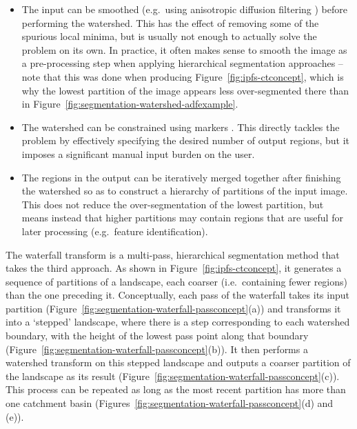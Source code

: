 \documentclass[preprint,a4paper]{elsarticle}
\begin{document}
\begin{itemize}

\item The input can be smoothed (e.g.~using anisotropic diffusion filtering \cite{perona90}) before performing the watershed. This has the effect of removing some of the spurious local minima, but is usually not enough to actually solve the problem on its own. In practice, it often makes sense to smooth the image as a pre-processing step when applying hierarchical segmentation approaches -- note that this was done when producing Figure~\ref{fig:ipfs-ctconcept}, which is why the lowest partition of the image appears less over-segmented there than in Figure~\ref{fig:segmentation-watershed-adfexample}.

\item The watershed can be constrained using markers \cite{meyer90}. This directly tackles the problem by effectively specifying the desired number of output regions, but it imposes a significant manual input burden on the user.

\item The regions in the output can be iteratively merged together after finishing the watershed so as to construct a hierarchy of partitions of the input image. This does not reduce the over-segmentation of the lowest partition, but means instead that higher partitions may contain regions that are useful for later processing (e.g.~feature identification).

\end{itemize}
%
The waterfall transform is a multi-pass, hierarchical segmentation method that takes the third approach. As shown in Figure~\ref{fig:ipfs-ctconcept}, it generates a sequence of partitions of a landscape, each coarser (i.e.~containing fewer regions) than the one preceding it. Conceptually, each pass of the waterfall takes its input partition (Figure~\ref{fig:segmentation-waterfall-passconcept}(a)) and transforms it into a `stepped' landscape, where there is a step corresponding to each watershed boundary, with the height of the lowest pass point along that boundary (Figure~\ref{fig:segmentation-waterfall-passconcept}(b)). It then performs a watershed transform on this stepped landscape and outputs a coarser partition of the landscape as its result (Figure~\ref{fig:segmentation-waterfall-passconcept}(c)). This process can be repeated as long as the most recent partition has more than one catchment basin (Figures~\ref{fig:segmentation-waterfall-passconcept}(d) and (e)).
\end{document}
